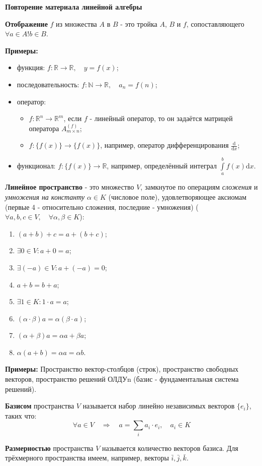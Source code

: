 \documentclass[12pt, a4paper]{article}
\newcommand{\di}{\mathrm{d}}
\begin{document}
\begin{center}
\begin{large}
\textbf{Повторение материала линейной алгебры}
\end{large}
\end{center}

\begin{small}
\textbf{Отображение} $f$ из множества $A$ в $B$ - это тройка $A$, $B$ и $f$, сопоставляющего $\forall a \in A ! b \in B$.

\textbf{Примеры:}
\begin{itemize}
 \item функция: $f: \mathbb{R} \to \mathbb{R}, \quad y = f(x)$;
 \item последовательность: $f: \mathbb{N} \to \mathbb{R}, \quad a_n = f(n)$;
 \item оператор:
 \begin{itemize}
  \item $f: \mathbb{R}^n \to \mathbb{R}^m$, если $f$ - линейный оператор, то он задаётся матрицей оператора $A^{(f)}_{m \times n}$;
  \item $f: \{f(x) \} \to \{f(x) \}$, например, оператор дифференцирования $\frac{\di}{\di x}$;
 \end{itemize}
 \item функционал: $f: \{f(x) \} \to \mathbb{R}$, например, определённый интеграл $\int \limits_a^b f(x) \di x$.
\end{itemize}

\textbf{Линейное пространство} - это множество $V$, замкнутое по операциям \textit{сложения} и \textit{умножения на константу} $\alpha \in K$ (числовое поле), удовлетворяющее аксиомам (первые 4 - относительно сложения, последние - умножения) ($\forall a,b,c \in V, \quad \forall \alpha, \beta \in K$):
\begin{enumerate}
 \item $(a+b)+c = a+(b+c)$;
 \item $\exists 0 \in V: a+0 = a$;
 \item $\exists (-a) \in V: a + (-a) = 0$;
 \item $a+b=b+a$;
 \item $\exists 1 \in K: 1 \cdot a = a$;
 \item $(\alpha \cdot \beta) a = \alpha (\beta \cdot a)$;
 \item $(\alpha + \beta) a = \alpha a + \beta a$;
 \item $\alpha (a + b) = \alpha a = \alpha b$.
\end{enumerate}

\textbf{Примеры:} Пространство вектор-столбцов (строк), пространство свободных векторов, пространство решений ОЛДУn (базис - фундаментальная система решений).

\textbf{Базисом} пространства $V$ называется набор линейно независимых векторов $\{e_i \}$, таких что:
\[\forall a \in V \quad \Rightarrow \quad a = \sum_i a_i \cdot e_i, \quad a_i \in K \]

\textbf{Размерностью} пространства $V$ называется количество векторов базиса. Для трёхмерного пространства имеем, например, векторы $\bar{i}, \bar{j}, \bar{k}$.
\end{small}
\end{document}
